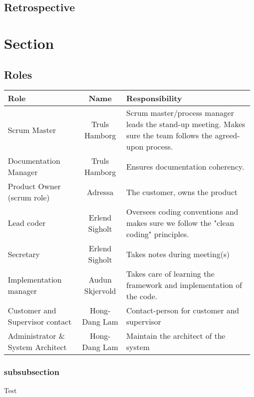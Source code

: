 \documentclass[12pt, a4paper]{article}
\begin{document}
\subsection{Retrospective}




\section{Section}
\subsection{Roles}
\begin{center}
  \begin{tabular}{| l  c  b{5cm}|}
    \hline
    Role & Name & Responsibility \\ \hline 
    Scrum Master & Truls Hamborg &  Scrum master/process manager leads the stand-up meeting. Makes sure the team follows the agreed-upon process. \\ \hline
    Documentation Manager & Truls Hamborg &  Ensures documentation coherency. \\ \hline
    Product Owner (scrum role) & Adressa & The customer, owns the product\\ \hline
    Lead coder & Erlend Sigholt & Oversees coding conventions and makes sure we follow the "clean coding" principles. \\ \hline
    Secretary & Erlend Sigholt & Takes notes during meeting(s) \\ \hline
    Implementation manager & Audun Skjervold & Takes care of learning the framework and implementation of the code.\\ \hline
    Customer and Supervisor contact & Hong-Dang Lam & Contact-person for customer and supervisor \\ \hline
    Administrator \& System Architect & Hong-Dang Lam & Maintain the architect of the system \\
    \hline
  \end{tabular}
\end{center}
\subsubsection{subsubsection}
Test
 
 
\end{document}
